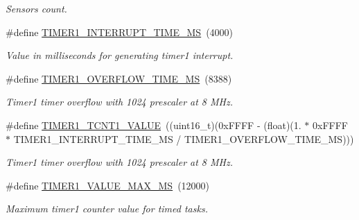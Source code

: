 \begin{DoxyCompactItemize}
\begin{DoxyCompactList}\small\item\em Sensors count. \end{DoxyCompactList}\item 
\mbox{\label{i2c-th-config_8h_a42354f9347cc2a67e00dd79c5da40833}} 
\#define \hyperlink{i2c-th-config_8h_a42354f9347cc2a67e00dd79c5da40833}{T\+I\+M\+E\+R1\+\_\+\+I\+N\+T\+E\+R\+R\+U\+P\+T\+\_\+\+T\+I\+M\+E\+\_\+\+MS}~(4000)
\begin{DoxyCompactList}\small\item\em Value in milliseconds for generating timer1 interrupt. \end{DoxyCompactList}\item 
\mbox{\label{i2c-th-config_8h_aa4674bad300dfeeb4b9479c5bdc21036}} 
\#define \hyperlink{i2c-th-config_8h_aa4674bad300dfeeb4b9479c5bdc21036}{T\+I\+M\+E\+R1\+\_\+\+O\+V\+E\+R\+F\+L\+O\+W\+\_\+\+T\+I\+M\+E\+\_\+\+MS}~(8388)
\begin{DoxyCompactList}\small\item\em Timer1 timer overflow with 1024 prescaler at 8 M\+Hz. \end{DoxyCompactList}\item 
\mbox{\label{i2c-th-config_8h_a346c738fa798abcc0c070d068da6380f}} 
\#define \hyperlink{i2c-th-config_8h_a346c738fa798abcc0c070d068da6380f}{T\+I\+M\+E\+R1\+\_\+\+T\+C\+N\+T1\+\_\+\+V\+A\+L\+UE}~((uint16\+\_\+t)(0x\+F\+F\+F\+F -\/ (float)(1. $\ast$ 0x\+F\+F\+F\+F $\ast$ T\+I\+M\+E\+R1\+\_\+\+I\+N\+T\+E\+R\+R\+U\+P\+T\+\_\+\+T\+I\+M\+E\+\_\+\+M\+S / T\+I\+M\+E\+R1\+\_\+\+O\+V\+E\+R\+F\+L\+O\+W\+\_\+\+T\+I\+M\+E\+\_\+\+M\+S)))
\begin{DoxyCompactList}\small\item\em Timer1 timer overflow with 1024 prescaler at 8 M\+Hz. \end{DoxyCompactList}\item 
\mbox{\label{i2c-th-config_8h_a988c83777a3764544137ac7493c3d0ac}} 
\#define \hyperlink{i2c-th-config_8h_a988c83777a3764544137ac7493c3d0ac}{T\+I\+M\+E\+R1\+\_\+\+V\+A\+L\+U\+E\+\_\+\+M\+A\+X\+\_\+\+MS}~(12000)
\begin{DoxyCompactList}\small\item\em Maximum timer1 counter value for timed tasks. \end{DoxyCompactList}\item 

\end{DoxyCompactItemize}
